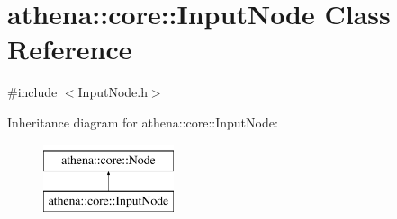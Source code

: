 \hypertarget{classathena_1_1core_1_1_input_node}{}\section{athena\+:\+:core\+:\+:Input\+Node Class Reference}
\label{classathena_1_1core_1_1_input_node}


{\ttfamily \#include $<$Input\+Node.\+h$>$}

Inheritance diagram for athena\+:\+:core\+:\+:Input\+Node\+:\begin{figure}[H]
\begin{center}
\leavevmode
\includegraphics[height=2.000000cm]{classathena_1_1core_1_1_input_node}
\end{center}
\end{figure}
